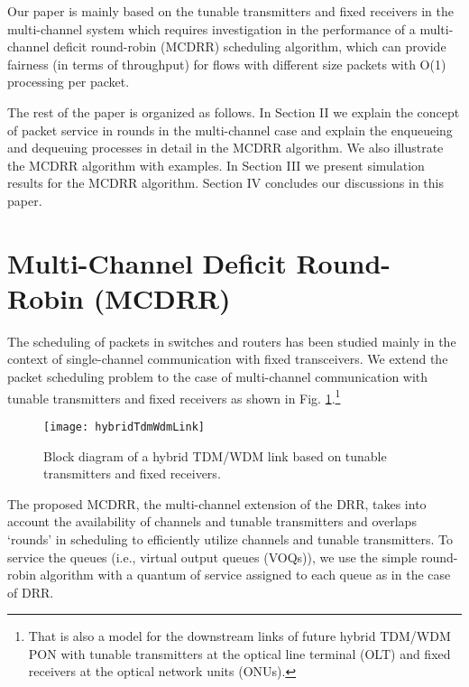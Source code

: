 \documentclass[conference,letterpaper]{IEEEtran}
\begin{document}
Our paper is mainly based on the tunable transmitters and fixed receivers in the
multi-channel system which requires investigation in the performance of a
multi-channel deficit round-robin (MCDRR) scheduling algorithm, which can
provide fairness (in terms of throughput) for flows with different size packets
with O(1) processing per packet.

The rest of the paper is organized as follows. In Section II we explain the
concept of packet service in rounds in the multi-channel case and explain the
enqueueing and dequeuing processes in detail in the MCDRR algorithm. We also
illustrate the MCDRR algorithm with examples. In Section III we present
simulation results for the MCDRR algorithm. Section IV concludes our discussions
in this paper.


\section{Multi-Channel Deficit Round-Robin (MCDRR)}
The scheduling of packets in switches and routers has been studied mainly in the
context of single-channel communication with fixed transceivers. We extend the
packet scheduling problem to the case of multi-channel communication with
tunable transmitters and fixed receivers as shown in
Fig. \ref{fig:hybrid_link}.\footnote{That is also a model for the downstream
  links of future hybrid TDM/WDM PON with tunable transmitters at the optical
  line terminal (OLT) and fixed receivers at the optical network units (ONUs).}
\begin{figure}[hbtp]
  \centering
  \texttt{[image: hybridTdmWdmLink]}  
  \caption{Block diagram of a hybrid TDM/WDM link based on tunable transmitters
    and fixed receivers.}
  \label{fig:hybrid_link}
\end{figure}
The proposed MCDRR, the multi-channel extension of the DRR, takes into account
the availability of channels and tunable transmitters and overlaps `rounds' in
scheduling to efficiently utilize channels and tunable transmitters. To service
the queues (i.e., virtual output queues (VOQs)), we use the simple round-robin
algorithm with a quantum of service assigned to each queue as in the case of
DRR.
\end{document}

